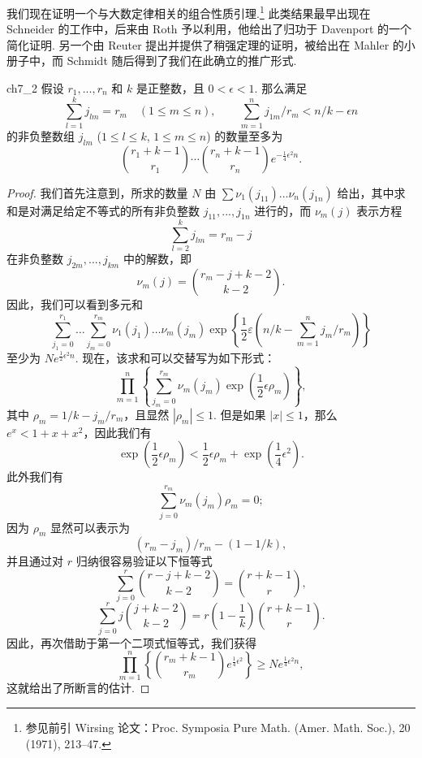 我们现在证明一个与大数定律相关的组合性质引理.\footnote{参见前引 Wirsing 论文：Proc. Symposia Pure Math. (Amer. Math. Soc.), 20 (1971), 213--47.} 此类结果最早出现在 Schneider 的工作中，后来由 Roth 予以利用，他给出了归功于 Davenport 的一个简化证明. 另一个由 Reuter 提出并提供了稍强定理的证明，被给出在 Mahler 的小册子中，而 Schmidt 随后得到了我们在此确立的推广形式.

\begin{mylemma}{}{ch7_2}
假设 $r_1, ..., r_n$ 和 $k$ 是正整数，且 $0 < \epsilon < 1$. 那么满足
\[\sum_{l=1}^k j_{lm} = r_m \quad (1 \leqslant m \leqslant n), \qquad \sum_{m=1}^n j_{1m}/r_m < n/k - \epsilon n\]
的非负整数组 $j_{lm}$ ($1 \leqslant l \leqslant k$, $1 \leqslant m \leqslant n$) 的数量至多为
\[\binom{r_1+k-1}{r_1}\cdots\binom{r_n+k-1}{r_n}e^{-\frac{1}{4}\epsilon^2n}.\]
\end{mylemma}

\begin{proof}
我们首先注意到，所求的数量 $N$ 由 $\sum \nu_1(j_{11})\dots\nu_n(j_{1n})$ 给出，其中求和是对满足给定不等式的所有非负整数 $j_{11}, ..., j_{1n}$ 进行的，而 $\nu_m(j)$ 表示方程
\[\sum_{l=2}^{k} j_{lm} = r_m - j\]
在非负整数 $j_{2m},...,j_{km}$ 中的解数，即
\[\nu_m(j) = \binom{r_m-j+k-2}{k-2}.\]
因此，我们可以看到多元和
\[\sum_{j_1=0}^{r_1} \dots \sum_{j_m=0}^{r_m} \nu_1(j_1) \dots \nu_m(j_m) \exp \left\{ \frac{1}{2} \varepsilon \left( n/k - \sum_{m=1}^n j_m/r_m \right) \right\}\]
至少为 $Ne^{\frac{1}{2}\epsilon^2n}$. 现在，该求和可以交替写为如下形式：
\[\prod_{m=1}^{n} \left\{ \sum_{j_{m}=0}^{r_{m}} \nu_{m}(j_{m}) \exp\left(\frac{1}{2}\epsilon \rho_{m}\right) \right\},\]
其中 $\rho_m = 1/k - j_m/r_m$，且显然 $|\rho_m| \le 1$. 但是如果 $|x| \le 1$，那么 $e^x < 1 + x + x^2$，因此我们有
\[\exp\left(\frac{1}{2}\epsilon\rho_m\right) < \frac{1}{2}\epsilon\rho_m + \exp\left(\frac{1}{4}\epsilon^2\right).\]
此外我们有
\[\sum_{j=0}^{r_m} \nu_m(j_m) \rho_m = 0;\]
因为 $\rho_m$ 显然可以表示为
\[(r_m - j_m)/r_m - (1 - 1/k),\]
并且通过对 $r$ 归纳很容易验证以下恒等式
\[\sum_{j=0}^{r} \binom{r-j+k-2}{k-2} = \binom{r+k-1}{r},\]
\[\sum_{j=0}^r j \binom{j+k-2}{k-2} = r \left(1-\frac{1}{k}\right) \binom{r+k-1}{r}.\]
因此，再次借助于第一个二项式恒等式，我们获得
\[ \prod_{m=1}^{n} \left\{ \binom{r_m + k - 1}{r_m} e^{\frac{1}{4}\epsilon^2} \right\} \geqslant N e^{\frac{1}{4}\epsilon^2 n}, \]
这就给出了所断言的估计.
\end{proof}

